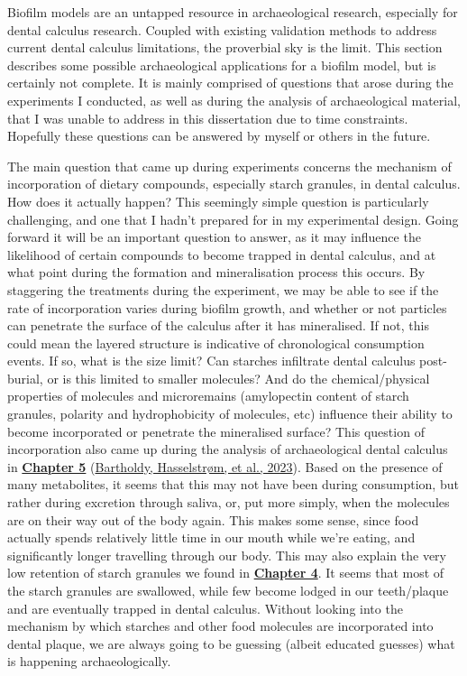 \documentclass[
  letterpaper,
]{book}
\begin{document}
Biofilm models are an untapped resource in archaeological research,
especially for dental calculus research. Coupled with existing
validation methods to address current dental calculus limitations, the
proverbial sky is the limit. This section describes some possible
archaeological applications for a biofilm model, but is certainly not
complete. It is mainly comprised of questions that arose during the
experiments I conducted, as well as during the analysis of
archaeological material, that I was unable to address in this
dissertation due to time constraints. Hopefully these questions can be
answered by myself or others in the future.

The main question that came up during experiments concerns the mechanism
of incorporation of dietary compounds, especially starch granules, in
dental calculus. How does it actually happen? This seemingly simple
question is particularly challenging, and one that I hadn't prepared for
in my experimental design. Going forward it will be an important
question to answer, as it may influence the likelihood of certain
compounds to become trapped in dental calculus, and at what point during
the formation and mineralisation process this occurs. By staggering the
treatments during the experiment, we may be able to see if the rate of
incorporation varies during biofilm growth, and whether or not particles
can penetrate the surface of the calculus after it has mineralised. If
not, this could mean the layered structure is indicative of
chronological consumption events. If so, what is the size limit? Can
starches infiltrate dental calculus post-burial, or is this limited to
smaller molecules? And do the chemical/physical properties of molecules
and microremains (amylopectin content of starch granules, polarity and
hydrophobicity of molecules, etc) influence their ability to become
incorporated or penetrate the mineralised surface? This question of
incorporation also came up during the analysis of archaeological dental
calculus in \protect\hyperlink{mb11CalculusPilot}{\textbf{Chapter 5}}
(\protect\hyperlink{ref-bartholdyMultiproxyAnalysis2023}{Bartholdy,
Hasselstrøm, et al., 2023}). Based on the presence of many metabolites,
it seems that this may not have been during consumption, but rather
during excretion through saliva, or, put more simply, when the molecules
are on their way out of the body again. This makes some sense, since
food actually spends relatively little time in our mouth while we're
eating, and significantly longer travelling through our body. This may
also explain the very low retention of starch granules we found in
\protect\hyperlink{byoc-starch}{\textbf{Chapter 4}}. It seems that most
of the starch granules are swallowed, while few become lodged in our
teeth/plaque and are eventually trapped in dental calculus. Without
looking into the mechanism by which starches and other food molecules
are incorporated into dental plaque, we are always going to be guessing
(albeit educated guesses) what is happening archaeologically.
\end{document}
